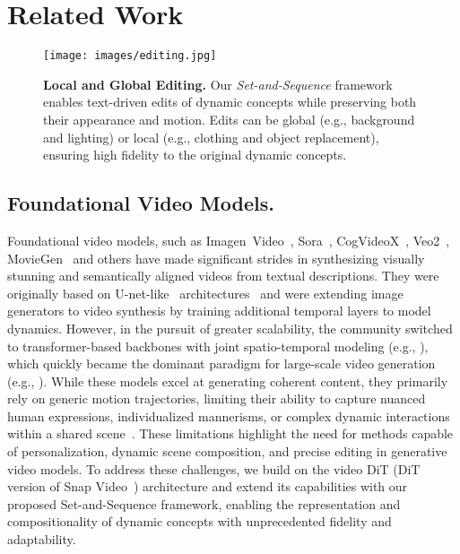 
\section{Related Work} 


\begin{figure*}[t!]
        \centering
        
        \texttt{[image: images/editing.jpg]}
        \caption{\textbf{Local and Global Editing.} Our \textit{Set-and-Sequence} framework enables text-driven edits of dynamic concepts while preserving both their appearance and motion. Edits can be global (e.g., background and lighting) or local (e.g., clothing and object replacement), ensuring high fidelity to the original dynamic concepts.}
        \label{fig:editing}
    \end{figure*}




\subsection{Foundational Video Models.}

Foundational video models, such as Imagen~Video~\cite{ho2022imagen}, Sora~\cite{sora}, CogVideoX~\cite{yang2024cogvideox}, Veo2~\cite{Veo2}, MovieGen~\cite{polyak2024movie} and others have made significant strides in synthesizing visually stunning and semantically aligned videos from textual descriptions. They were originally based on U-net-like~\cite{U-net} architectures~\cite{hong2022cogvideo,singer2022make,guo2023animatediff,blattmann2023stable} and were extending image generators to video synthesis by training additional temporal layers to model dynamics. However, in the pursuit of greater scalability, the community switched to transformer-based backbones with joint spatio-temporal modeling (e.g., \cite{sora,RIN,menapace2024snap}), which quickly became the dominant paradigm for large-scale video generation (e.g., \cite{polyak2024movie,sora,HunyuanVideo,yang2024cogvideox}). While these models excel at generating coherent content, they primarily rely on generic motion trajectories, limiting their ability to capture nuanced human expressions, individualized mannerisms, or complex dynamic interactions within a shared scene~\cite{sora,menapace2024snap}.
These limitations highlight the need for methods capable of personalization, dynamic scene composition, and precise editing in generative video models.
To address these challenges, we build on the video DiT (DiT version of Snap Video~\cite{menapace2024snap}) architecture and extend its capabilities with our proposed Set-and-Sequence framework, enabling the representation and compositionality of dynamic concepts with unprecedented fidelity and adaptability.







